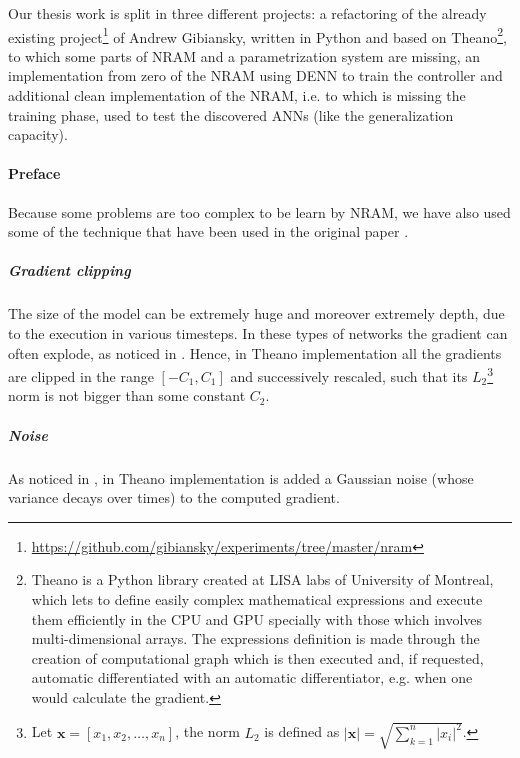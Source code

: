 \label{chap:implementation}
Our thesis work is split in three different projects: a refactoring of the already existing project\footnote{\hyperref[https://github.com/gibiansky/experiments/tree/master/nram]{https://github.com/gibiansky/experiments/tree/master/nram}} of Andrew Gibiansky, written in Python and based on Theano\footnote{Theano is a Python library created at LISA labs of University of Montreal, which lets to define easily complex mathematical expressions and execute them efficiently in the CPU and GPU specially with those which involves multi-dimensional arrays. The expressions definition is made through the creation of computational graph which is then executed and, if requested, automatic differentiated with an automatic differentiator, e.g. when one would calculate the gradient.}, to which some parts of NRAM and a parametrization system are missing, an implementation from zero of the NRAM using DENN to train the controller and additional clean implementation of the NRAM, i.e. to which is missing the training phase, used to test the discovered ANNs (like the generalization capacity).

\paragraph{Preface}
Because some problems are too complex to be learn by NRAM, we have also used some of the technique that have been used in the original paper \cite{NRAM:2016}.
\subparagraph{Gradient clipping}
The size of the model can be extremely huge and moreover extremely depth, due to the execution in various timesteps. In these types of networks the gradient can often explode, as noticed in \cite{Bengio1994LearningLD}. Hence, in Theano implementation all the gradients are clipped in the range $[-C_1, C_1]$ and successively rescaled, such that its $L_2$\footnote{Let $\textbf{x} = [x_1, x_2, \dots, x_n]$, the norm $L_2$ is defined as $|\textbf{x}| = \sqrt{\sum\limits_{k=1}^{n}|x_i|^2}$.} norm is not bigger than some constant $C_2$.

\subparagraph{Noise}
As noticed in \cite{Neelakantan2015AddingGN}, in Theano implementation is added a Gaussian noise (whose variance decays over times) to the computed gradient.

